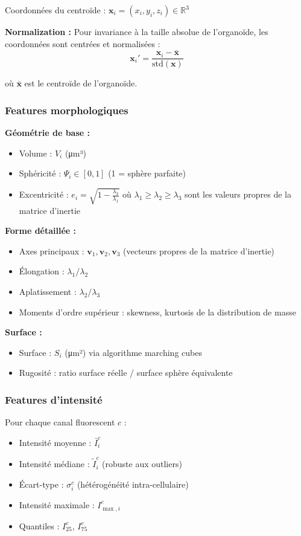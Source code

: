 Coordonnées du centroïde : $\mathbf{x}_i = (x_i, y_i, z_i) \in \mathbb{R}^3$

\textbf{Normalization :}
Pour invariance à la taille absolue de l'organoïde, les coordonnées sont centrées et normalisées :
\[
\mathbf{x}_i' = \frac{\mathbf{x}_i - \bar{\mathbf{x}}}{\text{std}(\mathbf{x})}
\]

où $\bar{\mathbf{x}}$ est le centroïde de l'organoïde.

\subsubsection{Features morphologiques}

\textbf{Géométrie de base :}
\begin{itemize}
    \item Volume : $V_i$ (μm³)
    \item Sphéricité : $\Psi_i \in [0,1]$ (1 = sphère parfaite)
    \item Excentricité : $e_i = \sqrt{1 - \frac{\lambda_3}{\lambda_1}}$ où $\lambda_1 \geq \lambda_2 \geq \lambda_3$ sont les valeurs propres de la matrice d'inertie
\end{itemize}

\textbf{Forme détaillée :}
\begin{itemize}
    \item Axes principaux : $\mathbf{v}_1, \mathbf{v}_2, \mathbf{v}_3$ (vecteurs propres de la matrice d'inertie)
    \item Élongation : $\lambda_1 / \lambda_2$
    \item Aplatissement : $\lambda_2 / \lambda_3$
    \item Moments d'ordre supérieur : skewness, kurtosis de la distribution de masse
\end{itemize}

\textbf{Surface :}
\begin{itemize}
    \item Surface : $S_i$ (μm²) via algorithme marching cubes
    \item Rugosité : ratio surface réelle / surface sphère équivalente
\end{itemize}

\subsubsection{Features d'intensité}

Pour chaque canal fluorescent $c$ :
\begin{itemize}
    \item Intensité moyenne : $\bar{I}_i^c$
    \item Intensité médiane : $\tilde{I}_i^c$ (robuste aux outliers)
    \item Écart-type : $\sigma_i^c$ (hétérogénéité intra-cellulaire)
    \item Intensité maximale : $I_{\max,i}^c$
    \item Quantiles : $I_{25}^c$, $I_{75}^c$
\end{itemize}

